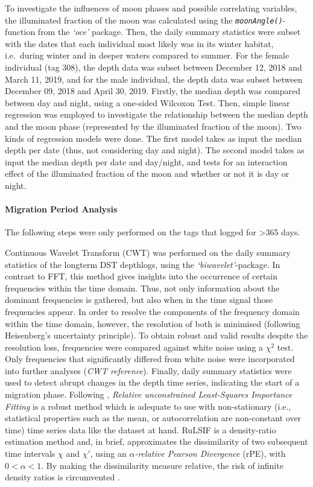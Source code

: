 \documentclass[
  authoryear,
  review,
  3p]{elsarticle}
\let\oldparagraph\paragraph
\renewcommand{\paragraph}[1]{\oldparagraph{#1}\mbox{}}
\begin{document}
To investigate the influences of moon phases and possible correlating
variables, the illuminated fraction of the moon was calculated using the
\emph{\texttt{moonAngle()}}-function from the \emph{`oce'} package.
Then, the daily summary statistics were subset with the dates that each
individual most likely was in its winter habitat, i.e.~during winter and
in deeper waters compared to summer. For the female individual (tag
308), the depth data was subset between December 12, 2018 and March 11,
2019, and for the male individual, the depth data was subset between
December 09, 2018 and April 30, 2019. Firstly, the median depth was
compared between day and night, using a one-sided Wilcoxon Test. Then,
simple linear regression was employed to investigate the relationship
between the median depth and the moon phase (represented by the
illuminated fraction of the moon). Two kinds of regression models were
done. The first model takes as input the median depth per date (thus,
not considering day and night). The second model takes as input the
median depth per date and day/night, and tests for an interaction effect
of the illuminated fraction of the moon and whether or not it is day or
night.

\hypertarget{sec-mm_migration}{%
\paragraph{Migration Period Analysis}\label{sec-mm_migration}}

The following steps were only performed on the tags that logged for
\textgreater365 days.

Continuous Wavelet Transform (CWT) was performed on the daily summary
statistics of the longterm DST depthlogs, using the
\emph{`biwavelet'}-package. In contrast to FFT, this method gives
insights into the occurrence of certain frequencies within the time
domain. Thus, not only information about the dominant frequencies is
gathered, but also when in the time signal those frequencies appear. In
order to resolve the components of the frequency domain within the time
domain, however, the resolution of both is minimised (following
Heisenberg's uncertainty principle). To obtain robust and valid results
despite the resolution loss, frequencies were compared against white
noise using a \(\chi^2\) test. Only frequencies that significantly
differed from white noise were incorporated into further analyses
(\emph{CWT reference}). Finally, daily summary statistics were used to
detect abrupt changes in the depth time series, indicating the start of
a migration phase. Following \citet{aminikhanghahi_2017}, \emph{Relative
unconstrained Least-Squares Importance Fitting}
\citep[RuLSIF,][]{liu_2013} is a robust method which is adequate to use
with non-stationary (i.e., statistical properties such as the mean, or
autocorrelation are non-constant over time) time series data like the
dataset at hand. RuLSIF is a density-ratio estimation method and, in
brief, approximates the dissimilarity of two subsequent time intervals
\(\chi\) and \(\chi'\), using an \(\alpha\)\emph{-relative Pearson
Divergence} (rPE), with \(0 < \alpha < 1\). By making the dissimilarity
measure relative, the risk of infinite density ratios is circumvented
\citep{liu_2013}.
\end{document}
